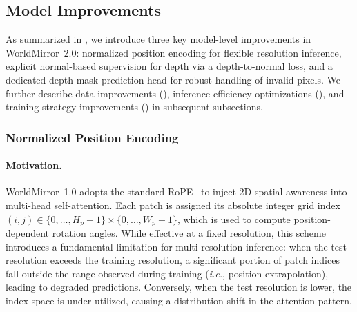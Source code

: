 \documentclass{article} %
\begin{document}
\subsection{Model Improvements}
\label{sec:model_improvements}

As summarized in , we introduce three key model-level improvements in WorldMirror~2.0: normalized position encoding for flexible resolution inference, explicit normal-based supervision for depth via a depth-to-normal loss, and a dedicated depth mask prediction head for robust handling of invalid pixels. We further describe data improvements (), inference efficiency optimizations (), and training strategy improvements () in subsequent subsections.

\subsubsection{Normalized Position Encoding}
\label{sec:normalized_rope}

\paragraph{Motivation.}
WorldMirror~1.0 adopts the standard RoPE~\cite{su2024roformer} to inject 2D spatial awareness into multi-head self-attention. Each patch is assigned its absolute integer grid index $(i, j) \in \{0,\dots,H_p{-}1\}\times\{0,\dots,W_p{-}1\}$, which is used to compute position-dependent rotation angles. While effective at a fixed resolution, this scheme introduces a fundamental limitation for multi-resolution inference: when the test resolution exceeds the training resolution, a significant portion of patch indices fall outside the range observed during training (\emph{i.e.}, position extrapolation), leading to degraded predictions. Conversely, when the test resolution is lower, the index space is under-utilized, causing a distribution shift in the attention pattern.
\end{document}

